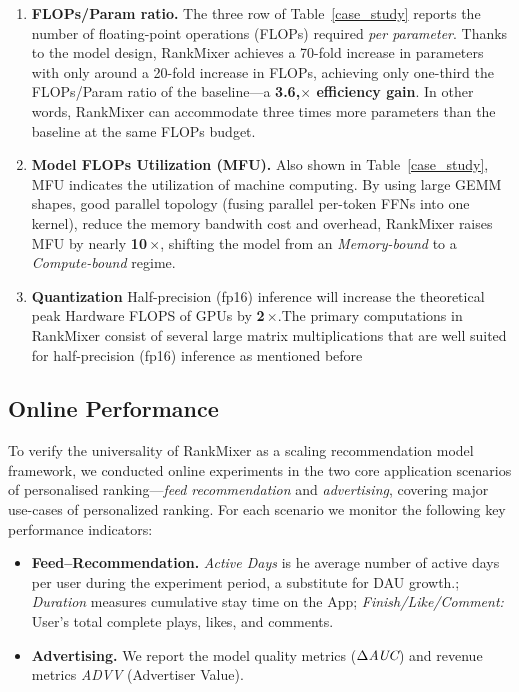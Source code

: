 \begin{enumerate}[leftmargin=1.3em]
    \item \textbf{FLOPs/Param ratio.}  
          The three row of Table~\ref{case_study} reports the number of floating-point operations (FLOPs) required \emph{per parameter}.  
          Thanks to the model design, RankMixer achieves a 70-fold increase in parameters with only around a 20-fold increase in FLOPs, achieving only one-third the FLOPs/Param ratio of the baseline—a \textbf{3.6,$\times$ efficiency gain}. In other words, RankMixer can accommodate three times more parameters than the baseline at the same FLOPs budget.
    \item \textbf{Model FLOPs Utilization (MFU).}  
          Also shown in Table~\ref{case_study}, MFU indicates the utilization of machine computing.  
          By using large GEMM shapes, good parallel topology (fusing parallel per-token FFNs into one kernel), reduce the memory bandwith cost and overhead, RankMixer raises MFU by nearly \textbf{10\,$\times$}, shifting the model from an \textit{Memory-bound} to a \textit{Compute-bound} regime.
    \item \textbf{Quantization}
         Half-precision (fp16) inference will increase the theoretical peak Hardware FLOPS of GPUs by \textbf{2\,$\times$}.The primary computations in RankMixer consist of several large matrix multiplications that are well suited for half-precision (fp16) inference as mentioned before
\end{enumerate}



\subsection{Online Performance }
To verify the universality of RankMixer as a scaling
recommendation model framework, we conducted online experiments in the two
core application scenarios of personalised ranking—\emph{feed
recommendation} and \emph{advertising}, covering
major use-cases of personalized ranking.
For each scenario we monitor the following key performance indicators:
\begin{itemize}
  \item \textbf{Feed–Recommendation.}  
        \emph{Active Days} is he average number of active days per user during the experiment period, a substitute for DAU growth.;  
        \emph{Duration} measures cumulative stay time on the App;  
        \emph{Finish/Like/Comment:} User's total complete plays, likes, and comments.
  \item \textbf{Advertising.}  
        We report the model quality metrics ($\Delta\emph{AUC}$) and revenue metrics
         \emph{ADVV} (Advertiser Value).
\end{itemize}

